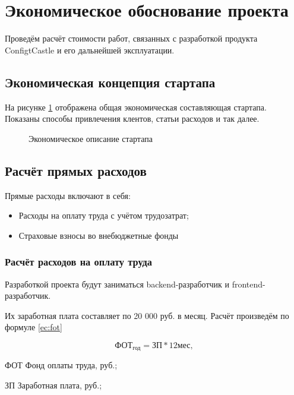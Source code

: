 \section{Экономическое обоснование проекта}

Проведём расчёт стоимости работ, связанных с разработкой
продукта ConfigtCastle и его дальнейшей эксплуатации.

\tocless\subsection{Экономическая концепция стартапа}

На рисунке \ref{ec:canvas} отображена общая экономическая составляющая стартапа.
Показаны способы привлечения клентов, статьи расходов и так далее.

\begin{figure}[H]
    \caption{Экономическое описание стартапа}
    \label{ec:canvas}
\end{figure}

\tocless\subsection{Расчёт прямых расходов}

Прямые расходы включают в себя:
\begin{itemize}
    \item Расходы на оплату труда с учётом трудозатрат;
    \item Страховые взносы во внебюджетные фонды
\end{itemize}

\subsubsection{Расчёт расходов на оплату труда}

Разработкой проекта будут заниматься backend-разработчик и
frontend-разработчик.

Их заработная плата составляет по 20 000 руб. в месяц. Расчёт произведём по формуле \ref{ec:fot}

\begin{equation}
    \label{ec:fot}
    \text{ФОТ}_\text{год} = \text{ЗП} * 12 \text{мес},
\end{equation}

\begin{eqexpl}[5ex]
    \item{ФОТ} Фонд оплаты труда, руб.;
    \item{ЗП} Заработная плата, руб.;
\end{eqexpl}

